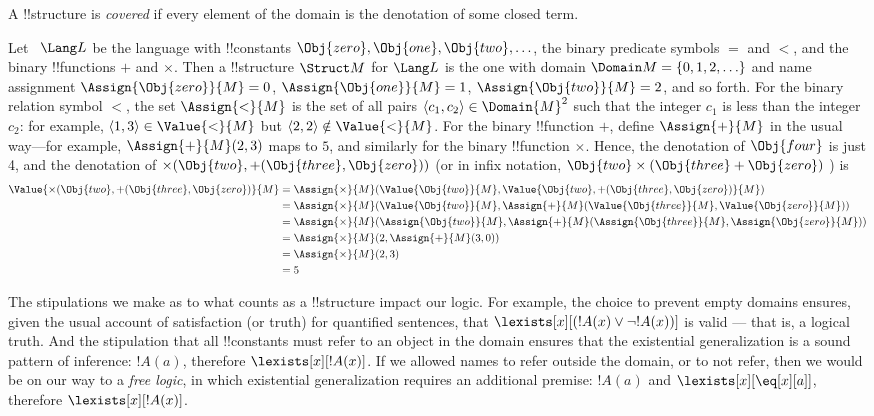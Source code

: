 \documentclass[../../include/open-logic-section]{subfiles}
\begin{document}
\begin{defn}
A !!{structure} is \emph{covered} if every element of the domain is the
denotation of some closed term.
\end{defn}

\begin{ex}
Let ~$\Lang L$ be the language with !!{constant}s $\Obj{zero},
\Obj{one}, \Obj{two}, \ldots$, the binary predicate symbols $=$
and $<$, and the binary !!{function}s $+$ and $\times$.  Then a
!!{structure} $\Struct M$ for $\Lang L$ is the one with domain
$\Domain M = \{0, 1, 2, \ldots \}$ and name assignment
$\Assign{\Obj{zero}}{M} = 0$, $\Assign{\Obj{one}}{M} = 1$,
$\Assign{\Obj{two}}{M} = 2$, and so forth. For the binary relation
symbol $<$, the set $\Assign{<}{M}$ is the set of all pairs $\langle
c_1, c_2 \rangle \in \Domain{M}^2$ such that the integer $c_1$ is less
than the integer $c_2$: for example, $\langle 1, 3 \rangle \in
\Value{<}{M}$ but $\langle 2, 2 \rangle \notin \Value{<}{M}$. For the
binary !!{function} $+$, define $\Assign{+}{M}$ in the usual way---for
example, $\Assign{+}{M}(2,3)$ maps to $5$, and similarly for the
binary !!{function} $\times$. Hence, the denotation of $\Obj{four}$
is just 4, and the denotation of $\times(\Obj{two},
+(\Obj{three},\Obj{zero}))$ (or in infix notation, $\Obj{two}
\times (\Obj{three} + \Obj{zero})$ ) is
\begin{align*} 
\Value{\times(\Obj{two}, +(\Obj{three},\Obj{zero})}{M}&=
\Assign{\times}{M}(\Value{\Obj{two}}{M}, \Value{\Obj{two}, 
+(\Obj{three}, \Obj{zero})}{M})\\
&= \Assign{\times}{M}(\Value{\Obj{two}}{M}, \Assign{+}{M}(\Value{\Obj{three}}{M}, 
\Value{\Obj{zero}}{M})) \\
&= \Assign{\times}{M}(\Assign{\Obj{two}}{M}, \Assign{+}{M}(\Assign{\Obj{three}}{M}, 
\Assign{\Obj{zero}}{M})) \\
&= \Assign{\times}{M}(2, \Assign{+}{M}(3, 0)) \\
&= \Assign{\times}{M}(2, 3) \\
&= 5
\end{align*}
\end{ex}

\begin{digress}
The stipulations we make as to what counts as a !!{structure} impact
our logic. For example, the choice to prevent empty domains ensures,
given the usual account of satisfaction (or truth) for quantified
sentences, that $\lexists[x][(!A(x) \lor \lnot !A(x))]$ is valid ---
that is, a logical truth. And the stipulation that all !!{constant}s
must refer to an object in the domain ensures that the existential
generalization is a sound pattern of inference: $!A(a)$, therefore
$\lexists[x][!A(x)]$. If we allowed names to refer outside the domain,
or to not refer, then we would be on our way to a \emph{free logic},
in which existential generalization requires an additional premise:
$!A(a)$ and $\lexists[x][\eq[x][a]]$, therefore $\lexists[x][!A(x)]$.
\end{digress}
\end{document}

